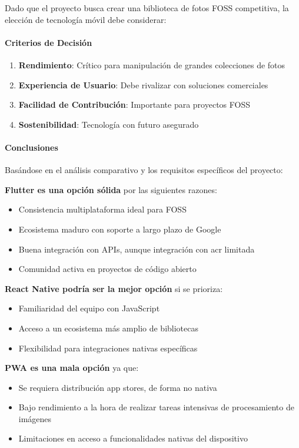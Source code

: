 Dado que el proyecto busca crear una biblioteca de fotos FOSS competitiva, la elección de tecnología móvil debe considerar:

\paragraph{Criterios de Decisión}
\begin{enumerate}
    \item \textbf{Rendimiento}: Crítico para manipulación de grandes colecciones de fotos
    \item \textbf{Experiencia de Usuario}: Debe rivalizar con soluciones comerciales
    \item \textbf{Facilidad de Contribución}: Importante para proyectos FOSS
    \item \textbf{Sostenibilidad}: Tecnología con futuro asegurado
\end{enumerate}

\paragraph{Conclusiones}
Basándose en el análisis comparativo y los requisitos específicos del proyecto:

\textbf{Flutter es una opción sólida} por las siguientes razones:
\begin{itemize}
    \item Consistencia multiplataforma ideal para FOSS
    \item Ecosistema maduro con soporte a largo plazo de Google
    \item Buena integración con APIs, aunque integración con \acrfull{acr} limitada
    \item Comunidad activa en proyectos de código abierto
\end{itemize}

\textbf{React Native podría ser la mejor opción} si se prioriza:
\begin{itemize}
    \item Familiaridad del equipo con JavaScript
    \item Acceso a un ecosistema más amplio de bibliotecas
    \item Flexibilidad para integraciones nativas específicas
\end{itemize}

\textbf{PWA es una mala opción} ya que:
\begin{itemize}
    \item Se requiera distribución app stores, de forma no nativa
    \item Bajo rendimiento a la hora de realizar tareas intensivas de procesamiento de imágenes
    \item Limitaciones en acceso a funcionalidades nativas del dispositivo
\end{itemize}

